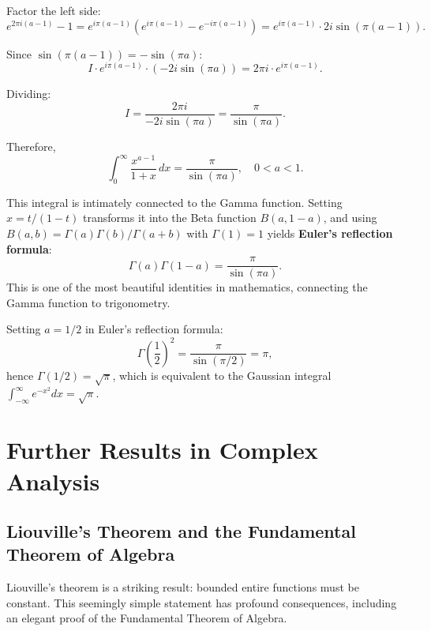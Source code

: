 \begin{example}
  Factor the left side:
  \[
    e^{2\pi i(a-1)} - 1 = e^{i\pi(a-1)} \left( e^{i\pi(a-1)} - e^{-i\pi(a-1)} \right) = e^{i\pi(a-1)} \cdot 2i \sin(\pi(a-1)).
  \]

  Since $\sin(\pi(a-1)) = -\sin(\pi a)$:
  \[
    I \cdot e^{i\pi(a-1)} \cdot (-2i \sin(\pi a)) = 2\pi i \cdot e^{i\pi(a-1)}.
  \]

  Dividing:
  \[
    I = \frac{2\pi i}{-2i \sin(\pi a)} = \frac{\pi}{\sin(\pi a)}.
  \]

  Therefore,
  \[
    \boxed{\int_0^{\infty} \frac{x^{a-1}}{1 + x} \, dx = \frac{\pi}{\sin(\pi a)}, \quad 0 < a < 1.}
  \]
\end{example}

\begin{remark}
  This integral is intimately connected to the Gamma function. Setting $x = t/(1-t)$ transforms it into the Beta function $B(a, 1-a)$, and using $B(a,b) = \Gamma(a)\Gamma(b)/\Gamma(a+b)$ with $\Gamma(1) = 1$ yields \textbf{Euler's reflection formula}:
  \[
    \Gamma(a) \Gamma(1-a) = \frac{\pi}{\sin(\pi a)}.
  \]
  This is one of the most beautiful identities in mathematics, connecting the Gamma function to trigonometry.
\end{remark}

\begin{corollary}
  Setting $a = 1/2$ in Euler's reflection formula:
  \[
    \Gamma\left(\frac{1}{2}\right)^2 = \frac{\pi}{\sin(\pi/2)} = \pi,
  \]
  hence $\Gamma(1/2) = \sqrt{\pi}$, which is equivalent to the Gaussian integral $\int_{-\infty}^{\infty} e^{-x^2} dx = \sqrt{\pi}$.
\end{corollary}

\chapter{Further Results in Complex Analysis}

\section{Liouville's Theorem and the Fundamental Theorem of Algebra}

Liouville's theorem is a striking result: bounded entire functions must be constant. This seemingly simple statement has profound consequences, including an elegant proof of the Fundamental Theorem of Algebra.

